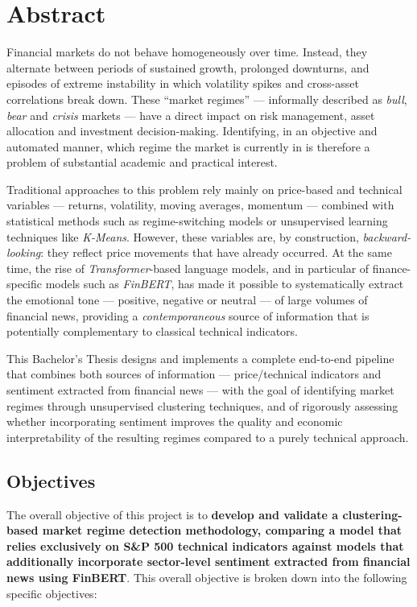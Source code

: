 \chapter*{Abstract}

Financial markets do not behave homogeneously over time. Instead, they
alternate between periods of sustained growth, prolonged downturns, and
episodes of extreme instability in which volatility spikes and
cross-asset correlations break down. These ``market regimes'' ---
informally described as \emph{bull}, \emph{bear} and \emph{crisis}
markets --- have a direct impact on risk management, asset allocation
and investment decision-making. Identifying, in an objective and
automated manner, which regime the market is currently in is therefore a
problem of substantial academic and practical interest.

Traditional approaches to this problem rely mainly on price-based and
technical variables --- returns, volatility, moving averages, momentum
--- combined with statistical methods such as regime-switching models or
unsupervised learning techniques like \textit{K-Means}. However, these
variables are, by construction, \emph{backward-looking}: they reflect
price movements that have already occurred. At the same time, the rise of
\textit{Transformer}-based language models, and in particular of
finance-specific models such as \textit{FinBERT}, has made it possible to
systematically extract the emotional tone --- positive, negative or
neutral --- of large volumes of financial news, providing a
\emph{contemporaneous} source of information that is potentially
complementary to classical technical indicators.

This Bachelor's Thesis designs and implements a complete end-to-end
pipeline that combines both sources of information --- price/technical
indicators and sentiment extracted from financial news --- with the goal
of identifying market regimes through unsupervised clustering techniques,
and of rigorously assessing whether incorporating sentiment improves the
quality and economic interpretability of the resulting regimes compared
to a purely technical approach.

\section*{Objectives}

The overall objective of this project is to \textbf{develop and validate
a clustering-based market regime detection methodology, comparing a model
that relies exclusively on S\&P 500 technical indicators against models
that additionally incorporate sector-level sentiment extracted from
financial news using FinBERT}. This overall objective is broken down into
the following specific objectives:

